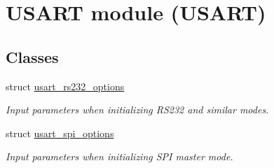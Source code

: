 \hypertarget{group__usart__group}{\section{U\-S\-A\-R\-T module (U\-S\-A\-R\-T)}
\label{group__usart__group}
}
\subsection*{Classes}
\begin{DoxyCompactItemize}
\item 
struct \hyperlink{structusart__rs232__options}{usart\-\_\-rs232\-\_\-options}
\begin{DoxyCompactList}\small\item\em Input parameters when initializing R\-S232 and similar modes. \end{DoxyCompactList}\item 
struct \hyperlink{structusart__spi__options}{usart\-\_\-spi\-\_\-options}
\begin{DoxyCompactList}\small\item\em Input parameters when initializing S\-P\-I master mode. \end{DoxyCompactList}\end{DoxyCompactItemize}
